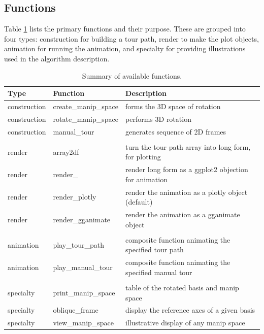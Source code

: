 \documentclass{monashthesis}
\begin{document}
\hypertarget{functions}{%
\subsection{Functions}\label{functions}}

Table \ref{tab:functionsTable} lists the primary functions and their purpose. These are grouped into four types: construction for building a tour path, render to make the plot objects, animation for running the animation, and specialty for providing illustrations used in the algorithm description.

\begin{table}

\caption{\label{tab:functionsTable}Summary of available functions.}
\centering
\begin{tabular}[t]{lll}
\toprule
Type & Function & Description\\
\midrule
construction & create\_manip\_space & forms the 3D space of rotation\\
construction & rotate\_manip\_space & performs 3D rotation\\
construction & manual\_tour & generates sequence of 2D frames\\
 &  & \\
render & array2df & turn the tour path array into long form, for plotting\\
render & render\_ & render long form as a ggplot2 objection for animation\\
render & render\_plotly & render the animation as a plotly object (default)\\
render & render\_gganimate & render the animation as a gganimate object\\
 &  & \\
animation & play\_tour\_path & composite function animating the specified tour path\\
animation & play\_manual\_tour & composite function animating the specified manual tour\\
 &  & \\
specialty & print\_manip\_space & table of the rotated basis and manip space\\
specialty & oblique\_frame & display the reference axes of a given basis\\
specialty & view\_manip\_space & illustrative display of any manip space\\
\bottomrule
\end{tabular}
\end{table}
\end{document}
